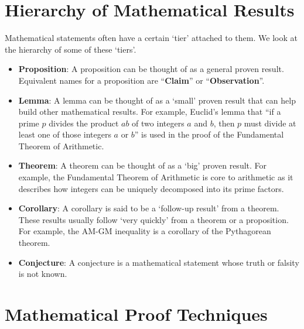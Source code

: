 \section{Hierarchy of Mathematical Results}
Mathematical statements often have a certain `tier' attached to them. We look at the hierarchy of some of these `tiers'.
\begin{itemize}
    \item \textbf{Proposition}: A proposition can be thought of as a general proven result. Equivalent names for a proposition are ``\textbf{Claim}'' or ``\textbf{Observation}''.
    \item \textbf{Lemma}: A lemma can be thought of as a `small' proven result that can help build other mathematical results. For example, Euclid's lemma that ``if a prime $p$ divides the product $ab$ of two integers $a$ and $b$, then $p$ must divide at least one of those integers $a$ or $b$'' is used in the proof of the Fundamental Theorem of Arithmetic.
    \item \textbf{Theorem}: A theorem can be thought of as a `big' proven result. For example, the Fundamental Theorem of Arithmetic is core to arithmetic as it describes how integers can be uniquely decomposed into its prime factors.
    \item \textbf{Corollary}: A corollary is said to be a `follow-up result' from a theorem. These results usually follow `very quickly' from a theorem or a proposition. For example, the AM-GM inequality is a corollary of the Pythagorean theorem.
    \item \textbf{Conjecture}: A conjecture is a mathematical statement whose truth or falsity is not known.
\end{itemize}

\section{Mathematical Proof Techniques}
